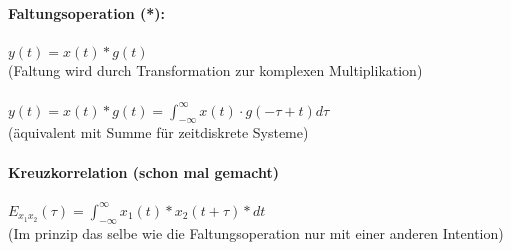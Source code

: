 \documentclass{article}
\begin{document}
\paragraph{Faltungsoperation (*):}
\begin{center}
$ y(t) = x(t) * g(t)$ \\
(Faltung wird durch Transformation zur komplexen Multiplikation) \\
\mbox{} \\
$y(t) = x(t) * g(t) = \int_{-\infty}^{\infty} x(t) \cdot g(-\tau + t) d\tau$ \\
(äquivalent mit Summe für zeitdiskrete Systeme)
\end{center}

\paragraph{Kreuzkorrelation (schon mal gemacht)}
\begin{center}
$E_{x_1x_2}(\tau) = \int_{-\infty}^{\infty} x_1(t) * x_2(t + \tau) * dt$ \\
(Im prinzip das selbe wie die Faltungsoperation nur mit einer anderen Intention)
\end{center}
\end{document}
